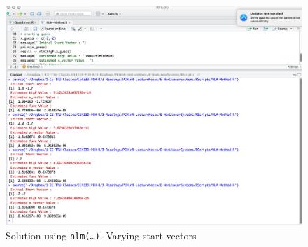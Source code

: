 \begin{figure}[h!] %
   \centering
   \includegraphics[width=6in]{./6-NonLinearSystems/NLM-Method-Works3.jpg} 
   \caption{Solution using \texttt{nlm(\dots)}.  Varying start vectors}
   \label{fig:NLM-Method-Works3}
\end{figure}

